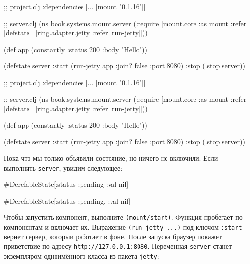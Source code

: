 \begin{english}
  \begin{clojure}
;; project.clj
:dependencies [... [mount "0.1.16"]]

;; server.clj
(ns book.systems.mount.server
  (:require
   [mount.core :as mount
    :refer [defstate]]
   [ring.adapter.jetty
    :refer [run-jetty]]))

(def app (constantly
           {:status 200 :body "Hello"}))

(defstate server
  :start (run-jetty app
           {:join? false :port 8080})
  :stop (.stop server))
  \end{clojure}
\end{english}

\else

\begin{english}
  \begin{clojure}
;; project.clj
:dependencies [... [mount "0.1.16"]]

;; server.clj
(ns book.systems.mount.server
  (:require
   [mount.core :as mount :refer [defstate]]
   [ring.adapter.jetty :refer [run-jetty]]))

(def app (constantly {:status 200 :body "Hello"}))

(defstate server
  :start (run-jetty app {:join? false :port 8080})
  :stop (.stop server))
  \end{clojure}
\end{english}

\fi

Пока что мы только объявили состояние, но ничего не включили. Если выполнить
\verb|server|, увидим следующее:

\ifx\DEVICETYPE\MOBILE

\begin{english}
  \begin{clojure}
#DerefableState[{:status :pending
                 :val nil}]
  \end{clojure}
\end{english}

\else

\begin{english}
  \begin{clojure}
#DerefableState[{:status :pending, :val nil}]
  \end{clojure}
\end{english}

\fi

\mnoindent
Чтобы запустить компонент, выполните \texttt{(mount\-/start)}. Функция пробегает
по компонентам и включает их. Выражение \verb|(run-jetty ...)| под ключом
\verb|:start| вернёт сервер, который работает в фоне. После запуска браузер
покажет приветствие по адресу \verb|http://127.0.0.1:8080|. Переменная
\verb|server| станет экземпляром одноимённого класса из пакета \verb|jetty|:

